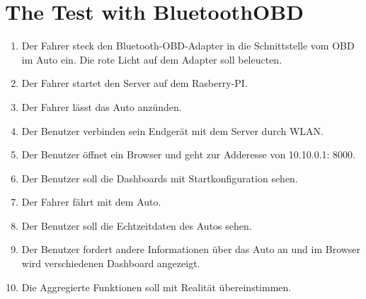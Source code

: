 \documentclass[qualitaetssicherung.tex]{subfiles}
\begin{document}
\section{The Test with BluetoothOBD}
\begin{enumerate}
  \item Der Fahrer steck den Bluetooth-OBD-Adapter in die Schnittstelle vom OBD
  im Auto ein. Die rote Licht auf dem Adapter soll beleucten.
  \item Der Fahrer startet den Server auf dem Rasberry-PI.
  \item Der Fahrer lässt das Auto anzünden.
  \item Der Benutzer verbinden sein Endgerät mit dem Server durch WLAN.
  \item Der Benutzer öffnet ein Browser und geht zur Adderesse von 10.10.0.1:
  8000.
  \item Der Benutzer soll die Dashboards mit Startkonfiguration sehen.
  \item Der Fahrer fährt mit dem Auto.
  \item Der Benutzer soll die Echtzeitdaten des Autos sehen.
  \item Der Benutzer fordert andere Informationen über das Auto an und im
  Browser wird verschiedenen Dashboard angezeigt.
  \item Die Aggregierte Funktionen soll mit Realität übereinstimmen.
\end{enumerate}
\end{document}
